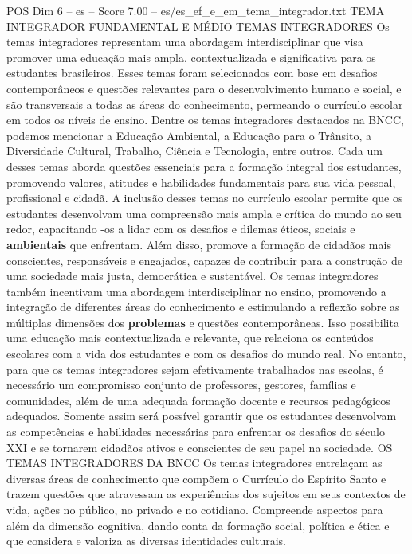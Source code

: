 \begin{textsample}{POS Dim 6 – es – Score 7.00 – es/es\_ef\_e\_em\_tema\_integrador.txt}  \label{ex:f6_pos_149}
TEMA INTEGRADOR FUNDAMENTAL E MÉDIO TEMAS INTEGRADORES Os temas integradores representam uma abordagem interdisciplinar que visa promover uma educação mais ampla, contextualizada e significativa para os estudantes brasileiros.
Esses temas foram selecionados com base em desafios contemporâneos e questões relevantes para o desenvolvimento humano e social, e são transversais a todas as áreas do conhecimento, permeando o currículo escolar em todos os níveis de ensino.
Dentre os temas integradores destacados na BNCC, podemos mencionar a Educação Ambiental, a Educação para o Trânsito, a Diversidade Cultural, Trabalho, Ciência e Tecnologia, entre outros.
Cada um desses temas aborda questões essenciais para a formação integral dos estudantes, promovendo valores, atitudes e habilidades fundamentais para sua vida pessoal, profissional e cidadã.
A inclusão desses temas no currículo escolar permite que os estudantes desenvolvam uma compreensão mais ampla e crítica do mundo ao seu redor, capacitando -os a lidar com os desafios e dilemas éticos, sociais e \textbf{ambientais} que enfrentam.
Além disso, promove a formação de cidadãos mais conscientes, responsáveis e engajados, capazes de contribuir para a construção de uma sociedade mais justa, democrática e sustentável.
Os temas integradores também incentivam uma abordagem interdisciplinar no ensino, promovendo a integração de diferentes áreas do conhecimento e estimulando a reflexão sobre as múltiplas dimensões dos \textbf{problemas} e questões contemporâneas.
Isso possibilita uma educação mais contextualizada e relevante, que relaciona os conteúdos escolares com a vida dos estudantes e com os desafios do mundo real.
No entanto, para que os temas integradores sejam efetivamente trabalhados nas escolas, é necessário um compromisso conjunto de professores, gestores, famílias e comunidades, além de uma adequada formação docente e recursos pedagógicos adequados.
Somente assim será possível garantir que os estudantes desenvolvam as competências e habilidades necessárias para enfrentar os desafios do século XXI e se tornarem cidadãos ativos e conscientes de seu papel na sociedade.
OS TEMAS INTEGRADORES DA BNCC Os temas integradores entrelaçam as diversas áreas de conhecimento que compõem o Currículo do Espírito Santo e trazem questões que atravessam as experiências dos sujeitos em seus contextos de vida, ações no público, no privado e no cotidiano.
Compreende aspectos para além da dimensão cognitiva, dando conta da formação social, política e ética e que considera e valoriza as diversas identidades culturais.

\end{textsample}
